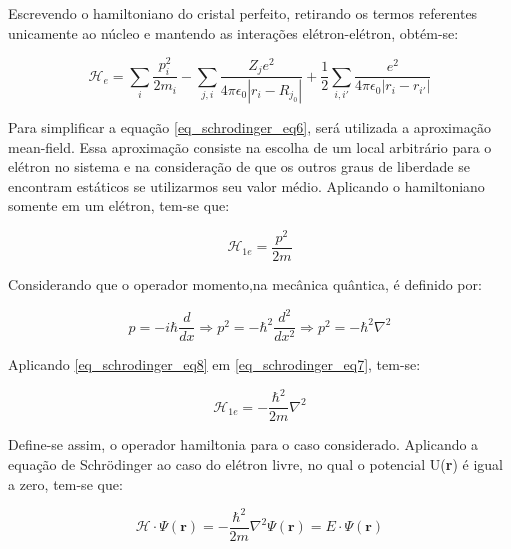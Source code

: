 \documentclass[11pt]{article}
\numberwithin{equation}{section}
\begin{document}
      \par Escrevendo o hamiltoniano do cristal perfeito, retirando os termos referentes unicamente ao núcleo e mantendo as interações elétron-elétron, obtém-se:

      \begin{equation}\label{eq_schrodinger_eq6}
        \mathcal{H}_{e} = 
          \sum_{i} \frac{p_{i}^2}{2m_{i}} 
          -  \sum_{j, i} \frac{Z_{j} e^2}{4\pi\epsilon_{0}\left|r_{i} - R_{j_{0}}\right|} 
          + \frac{1}{2} \sum_{i, i'} \frac{e^2}{4\pi\epsilon_{0}\left|r_{i} - r_{i'}\right|}
      \end{equation}

      \par Para simplificar a equação \eqref{eq_schrodinger_eq6}, será utilizada a aproximação mean-field. Essa aproximação consiste na escolha de um local arbitrário para o elétron no sistema e na consideração de que os outros graus de liberdade se encontram estáticos se utilizarmos seu valor médio. Aplicando o hamiltoniano somente em um elétron, tem-se que:

      \begin{equation}\label{eq_schrodinger_eq7}
        \mathcal{H}_{1e} = \frac{p^2}{2m}
      \end{equation}

      Considerando que o operador momento,na mecânica quântica, é definido por:

      \begin{equation}\label{eq_schrodinger_eq8}
        p = -i\hbar\frac{d}{dx} \Longrightarrow
        p^2 = -\hbar^2 \frac{d^2}{dx^2} \Longrightarrow
        p^2 = -\hbar^2 \nabla^2
      \end{equation}

      Aplicando \eqref{eq_schrodinger_eq8} em \eqref{eq_schrodinger_eq7}, tem-se:

      \begin{equation}\label{eq_schrodinger_eq9}
        \mathcal{H}_{1e} = - \frac{\hbar^2}{2m}\nabla^2
      \end{equation}

      Define-se assim, o operador hamiltonia para o caso considerado. Aplicando a equação de Schrödinger ao caso do elétron livre, no qual o potencial U(\textbf{r}) é igual a zero, tem-se que:

      \begin{equation}\label{eq_schrodinger_eq10}
        \mathcal{H} \cdot \Psi(\mathbf{r}) =
          -\frac{\hbar^2}{2m} \nabla^2 \Psi(\mathbf{r}) =
          E \cdot \Psi(\mathbf{r})
      \end{equation}
\end{document}
